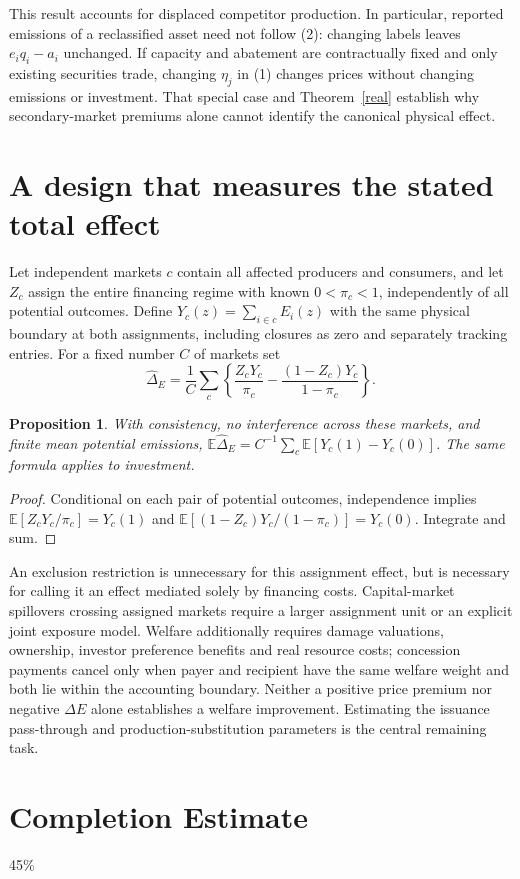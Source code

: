 \documentclass[11pt]{article}
\newtheorem{proposition}[theorem]{Proposition}
\newcommand{\E}{\mathbb E}
\begin{document}
This result accounts for displaced competitor production. In particular,
reported emissions of a reclassified asset need not follow (2): changing
labels leaves $e_iq_i-a_i$ unchanged. If capacity and abatement are
contractually fixed and only existing securities trade, changing $\eta_j$
in (1) changes prices without changing emissions or investment. That
special case and Theorem~\ref{real} establish why secondary-market
premiums alone cannot identify the canonical physical effect.

\section{A design that measures the stated total effect}
Let independent markets $c$ contain all affected producers and consumers,
and let $Z_c$ assign the entire financing regime with known
$0<\pi_c<1$, independently of all potential outcomes. Define
$Y_c(z)=\sum_{i\in c}E_i(z)$ with the same physical boundary at both
assignments, including closures as zero and separately tracking entries.
For a fixed number $C$ of markets set
\[
 \widehat\Delta_E=\frac1C\sum_c
 \left\{\frac{Z_cY_c}{\pi_c}-
             \frac{(1-Z_c)Y_c}{1-\pi_c}\right\}.
\]
\begin{proposition}
With consistency, no interference across these markets, and finite mean
potential emissions, $\E\widehat\Delta_E=C^{-1}\sum_c
\E[Y_c(1)-Y_c(0)]$. The same formula applies to investment.
\end{proposition}
\begin{proof}
Conditional on each pair of potential outcomes, independence implies
$\E[Z_cY_c/\pi_c]=Y_c(1)$ and
$\E[(1-Z_c)Y_c/(1-\pi_c)]=Y_c(0)$. Integrate and sum.
\end{proof}

An exclusion restriction is unnecessary for this assignment effect, but
is necessary for calling it an effect mediated solely by financing costs.
Capital-market spillovers crossing assigned markets require a larger
assignment unit or an explicit joint exposure model. Welfare additionally
requires damage valuations, ownership, investor preference benefits and
real resource costs; concession payments cancel only when payer and
recipient have the same welfare weight and both lie within the accounting
boundary. Neither a positive price premium nor negative $\Delta E$ alone
establishes a welfare improvement. Estimating the issuance pass-through
and production-substitution parameters is the central remaining task.

\section{Completion Estimate}
45\%
\end{document}
